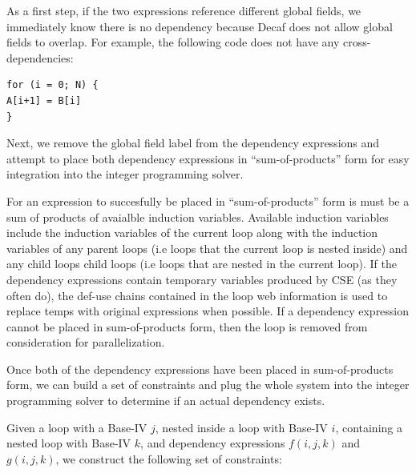 \documentclass[11pt]{article}
\begin{document}
As a first step, if the two expressions
reference different global fields, we immediately know there is no
dependency because Decaf does not allow global fields to overlap. For
example, the following code does not have any cross-dependencies: 

\begin{verbatim}
for (i = 0; N) {
A[i+1] = B[i]
}
\end{verbatim}

Next, we remove the global field label from the dependency expressions
and attempt to place both dependency expressions in
``sum-of-products'' form for easy integration into the integer
programming solver. 

For an expression to succesfully be placed in ``sum-of-products'' form
is must be a sum of products of avaialble induction
variables. Available induction variables include the induction
variables of the current loop along with the induction variables of
any parent loops (i.e loops that the current loop is nested inside)
and any child loops child loops (i.e loops that are nested in the
current loop). If the dependency expressions contain temporary variables produced
by CSE (as they often do), the def-use chains contained in the loop
web information is used to replace temps with original expressions
when possible. If a dependency expression cannot be placed in sum-of-products form,
then the loop is removed from consideration for parallelization. 

Once both of the dependency expressions have been placed in
sum-of-products form, we can build a set of constraints and plug the
whole system into the integer programming solver to determine if an
actual dependency exists. 

Given a loop with a Base-IV $j$, nested inside a loop with Base-IV
$i$, containing a nested loop with Base-IV $k$, and dependency
expressions $f(i, j, k)$ and $g(i, j, k)$, we construct the following
set of constraints: 
\end{document}
